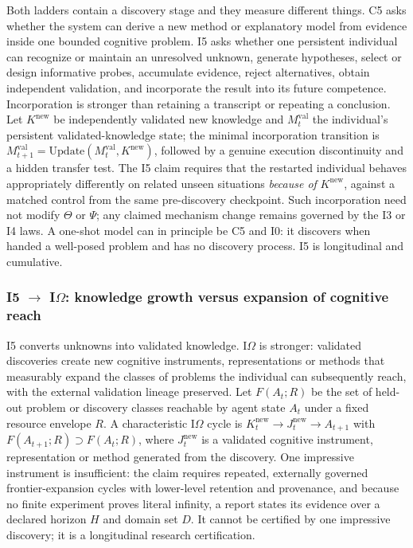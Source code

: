 \documentclass[11pt]{article}
\theoremstyle{definition}
\newcommand{\Om}{\ensuremath{\Omega}}
\begin{document}
Both ladders contain a discovery stage and they measure different things. C5 asks whether the system can derive a new method or explanatory model from evidence inside one bounded cognitive problem. I5 asks whether one persistent individual can recognize or maintain an unresolved unknown, generate hypotheses, select or design informative probes, accumulate evidence, reject alternatives, obtain independent validation, and incorporate the result into its future competence. Incorporation is stronger than retaining a transcript or repeating a conclusion. Let $K^{\mathrm{new}}$ be independently validated new knowledge and $M^{\mathrm{val}}_t$ the individual's persistent validated-knowledge state; the minimal incorporation transition is $M^{\mathrm{val}}_{t+1} = \mathrm{Update}(M^{\mathrm{val}}_t, K^{\mathrm{new}})$, followed by a genuine execution discontinuity and a hidden transfer test. The I5 claim requires that the restarted individual behaves appropriately differently on related unseen situations \emph{because of} $K^{\mathrm{new}}$, against a matched control from the same pre-discovery checkpoint. Such incorporation need not modify $\Theta$ or $\Psi$; any claimed mechanism change remains governed by the I3 or I4 laws. A one-shot model can in principle be C5 and I0: it discovers when handed a well-posed problem and has no discovery process. I5 is longitudinal and cumulative.

\subsubsection{I5 $\to$ I\Om{}: knowledge growth versus expansion of cognitive reach}\label{sec:iomega}

I5 converts unknowns into validated knowledge. I\Om{} is stronger: validated discoveries create new cognitive instruments, representations or methods that measurably expand the classes of problems the individual can subsequently reach, with the external validation lineage preserved. Let $F(A_t; R)$ be the set of held-out problem or discovery classes reachable by agent state $A_t$ under a fixed resource envelope $R$. A characteristic I\Om{} cycle is $K^{\mathrm{new}}_t \to J^{\mathrm{new}}_t \to A_{t+1}$ with $F(A_{t+1}; R) \supset F(A_t; R)$, where $J^{\mathrm{new}}_t$ is a validated cognitive instrument, representation or method generated from the discovery. One impressive instrument is insufficient: the claim requires repeated, externally governed frontier-expansion cycles with lower-level retention and provenance, and because no finite experiment proves literal infinity, a report states its evidence over a declared horizon $H$ and domain set $D$. It cannot be certified by one impressive discovery; it is a longitudinal research certification.
\end{document}
